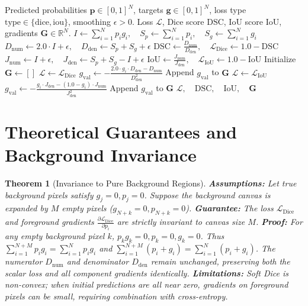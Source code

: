 \documentclass[11pt]{article}
\newtheorem{theorem}{Theorem}
\begin{document}
\begin{algorithm}[H]
\caption{Continuous Overlap Segmentation Loss and Gradient Evaluation}
\label{alg:overlap_losses}
\begin{algorithmic}[1]
\Require Predicted probabilities $\mathbf{p} \in [0, 1]^N$, targets $\mathbf{g} \in [0, 1]^N$, loss type $\mathrm{type} \in \{\text{dice}, \text{iou}\}$, smoothing $\epsilon > 0$.
\Ensure Loss $\mathcal{L}$, Dice score $\mathrm{DSC}$, IoU score $\mathrm{IoU}$, gradients $\mathbf{G} \in \mathbb{R}^N$.
\State $I \gets \sum_{i=1}^N p_i g_i, \quad S_p \gets \sum_{i=1}^N p_i, \quad S_g \gets \sum_{i=1}^N g_i$
\State $D_{\mathrm{num}} \gets 2.0 \cdot I + \epsilon, \quad D_{\mathrm{den}} \gets S_p + S_g + \epsilon$
\State $\mathrm{DSC} \gets \frac{D_{\mathrm{num}}}{D_{\mathrm{den}}}, \quad \mathcal{L}_{\mathrm{Dice}} \gets 1.0 - \mathrm{DSC}$
\State $J_{\mathrm{num}} \gets I + \epsilon, \quad J_{\mathrm{den}} \gets S_p + S_g - I + \epsilon$
\State $\mathrm{IoU} \gets \frac{J_{\mathrm{num}}}{J_{\mathrm{den}}}, \quad \mathcal{L}_{\mathrm{IoU}} \gets 1.0 - \mathrm{IoU}$
\State Initialize $\mathbf{G} \gets []$
    \State $\mathcal{L} \gets \mathcal{L}_{\mathrm{Dice}}$
        \State $g_{\mathrm{val}} \gets -\frac{2.0 \cdot g_i \cdot D_{\mathrm{den}} - D_{\mathrm{num}}}{D_{\mathrm{den}}^2}$
        \State Append $g_{\mathrm{val}}$ to $\mathbf{G}$
    \EndFor
\Else
    \State $\mathcal{L} \gets \mathcal{L}_{\mathrm{IoU}}$
        \State $g_{\mathrm{val}} \gets -\frac{g_i \cdot J_{\mathrm{den}} - (1.0 - g_i) \cdot J_{\mathrm{num}}}{J_{\mathrm{den}}^2}$
        \State Append $g_{\mathrm{val}}$ to $\mathbf{G}$
    \EndFor
\EndIf
\State \Return $\mathcal{L}, \quad \mathrm{DSC}, \quad \mathrm{IoU}, \quad \mathbf{G}$
\end{algorithmic}
\end{algorithm}

\section{Theoretical Guarantees and Background Invariance}
\label{sec:guarantees}

\begin{theorem}[Invariance to Pure Background Regions]
\label{thm:dice_background_invariance}
\textbf{Assumptions:} Let true background pixels satisfy $g_j = 0, p_j = 0$. Suppose the background canvas is expanded by $M$ empty pixels ($g_{N+k} = 0, p_{N+k} = 0$).
\textbf{Guarantee:} The loss $\mathcal{L}_{\mathrm{Dice}}$ and foreground gradients $\frac{\partial \mathcal{L}_{\mathrm{Dice}}}{\partial p_i}$ are strictly invariant to canvas size $M$.
\textbf{Proof:}
For any empty background pixel $k$, $p_k g_k = 0, p_k = 0, g_k = 0$.
Thus $\sum_{i=1}^{N+M} p_i g_i = \sum_{i=1}^N p_i g_i$ and $\sum_{i=1}^{N+M} (p_i + g_i) = \sum_{i=1}^N (p_i + g_i)$.
The numerator $D_{\mathrm{num}}$ and denominator $D_{\mathrm{den}}$ remain unchanged, preserving both the scalar loss and all component gradients identically.
\textbf{Limitations:} Soft Dice is non-convex; when initial predictions are all near zero, gradients on foreground pixels can be small, requiring combination with cross-entropy.
\end{theorem}
\end{document}
